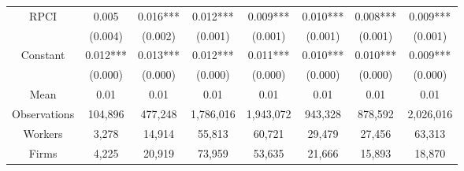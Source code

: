 \begin{tabular}{cccccccc}
\midrule
RPCI  & 0.005 & 0.016*** & 0.012*** & 0.009*** & 0.010*** & 0.008*** & 0.009*** \\
      & (0.004) & (0.002) & (0.001) & (0.001) & (0.001) & (0.001) & (0.001) \\
Constant & 0.012*** & 0.013*** & 0.012*** & 0.011*** & 0.010*** & 0.010*** & 0.009*** \\
      & (0.000) & (0.000) & (0.000) & (0.000) & (0.000) & (0.000) & (0.000) \\
Mean  & 0.01  & 0.01  & 0.01  & 0.01  & 0.01  & 0.01  & 0.01 \\
\midrule
Observations & 104,896 & 477,248 & 1,786,016 & 1,943,072 & 943,328 & 878,592 & 2,026,016 \\
Workers & 3,278 & 14,914 & 55,813 & 60,721 & 29,479 & 27,456 & 63,313 \\
Firms & 4,225 & 20,919 & 73,959 & 53,635 & 21,666 & 15,893 & 18,870 \\
\bottomrule
\bottomrule
\end{tabular}%
